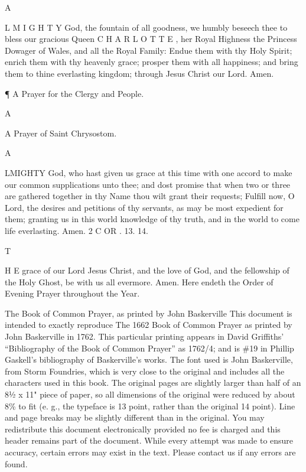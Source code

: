 A

L M I G H T Y God, the fountain of all goodness, we humbly beseech thee to bless our gracious Queen C H A R L O T T E , her Royal Highness the Princess Dowager of Wales, and all the Royal Family: Endue them with thy Holy Spirit; enrich them with thy heavenly grace; prosper them with all happiness; and bring them to thine everlasting kingdom; through Jesus Christ our Lord. Amen.

¶ A Prayer for the Clergy and People.

A

A Prayer of Saint Chrysostom.

A

LMIGHTY God, who hast given us grace at this time with one accord to make our common supplications unto thee; and dost promise that when two or three are gathered together in thy Name thou wilt grant their requests; Fulfill now, O Lord, the desires and petitions of thy servants, as may be most expedient for them; granting us in this world knowledge of thy truth, and in the world to come life everlasting. Amen. 2 C OR . 13. 14.

T

H E grace of our Lord Jesus Christ, and the love of God, and the fellowship of the Holy Ghost, be with us all evermore. Amen. Here endeth the Order of Evening Prayer throughout the Year.


The Book of Common Prayer, as printed by John Baskerville This document is intended to exactly reproduce The 1662 Book of Common Prayer as printed by John Baskerville in 1762. This particular printing appears in David Griffiths' “Bibliography of the Book of Common Prayer” as 1762/4; and is \#19 in Phillip Gaskell's bibliography of Baskerville's works. The font used is John Baskerville, from Storm Foundries, which is very close to the original and includes all the characters used in this book. The original pages are slightly larger than half of an 8½ x 11" piece of paper, so all dimensions of the original were reduced by about 8\% to fit (e. g., the typeface is 13 point, rather than the original 14 point). Line and page breaks may be slightly different than in the original. You may redistribute this document electronically provided no fee is charged and this header remains part of the document. While every attempt was made to ensure accuracy, certain errors may exist in the text. Please contact us if any errors are found.

